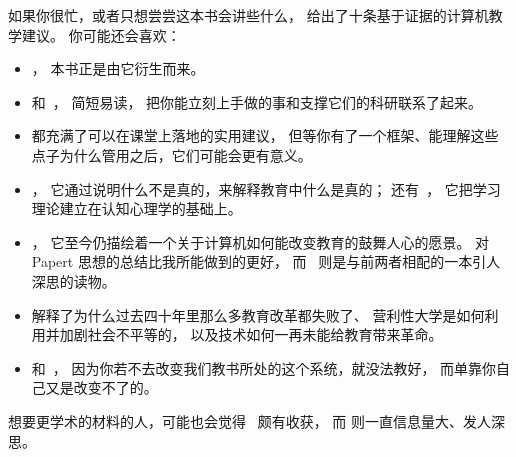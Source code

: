 
如果你很忙，或者只想尝尝这本书会讲些什么，
\cite{Brow2018}给出了十条基于证据的计算机教学建议。
你可能还会喜欢：

\begin{itemize}

\item
  ，
  本书正是由它衍生而来。

\item
  \cite{Lang2016} 和~\cite{Hust2012}，
  简短易读，
  把你能立刻上手做的事和支撑它们的科研联系了起来。

\item
  \cite{Berg2012,Lemo2014,Majo2015,Broo2016,Rice2018,Wein2018b}
  都充满了可以在课堂上落地的实用建议，
  但等你有了一个框架、能理解这些点子为什么管用之后，它们可能会更有意义。

\item
  \cite{DeBr2015}，
  它通过说明什么不是真的，来解释教育中什么是真的；
  还有~\cite{Dida2016}，
  它把学习理论建立在认知心理学的基础上。

\item
  \cite{Pape1993}，
  它至今仍描绘着一个关于计算机如何能改变教育的鼓舞人心的愿景。
  对 Papert 思想的总结比我所能做到的更好，
  而~\cite{Craw2010} 则是与前两者相配的一本引人深思的读物。

\item
  \cite{Gree2014,McMi2017,Watt2014} 解释了为什么过去四十年里那么多教育改革都失败了、
  营利性大学是如何利用并加剧社会不平等的，
  以及技术如何一再未能给教育带来革命。

\item
  \cite{Brow2007} 和~\cite{Mann2015}，
  因为你若不去改变我们教书所处的这个系统，就没法教好，
  而单靠你自己又是改变不了的。

\end{itemize}

想要更学术的材料的人，可能也会觉得~\cite{Guzd2015a,Hazz2014,Sent2018,Finc2019,Hpl2018} 颇有收获，
而 则一直信息量大、发人深思。



